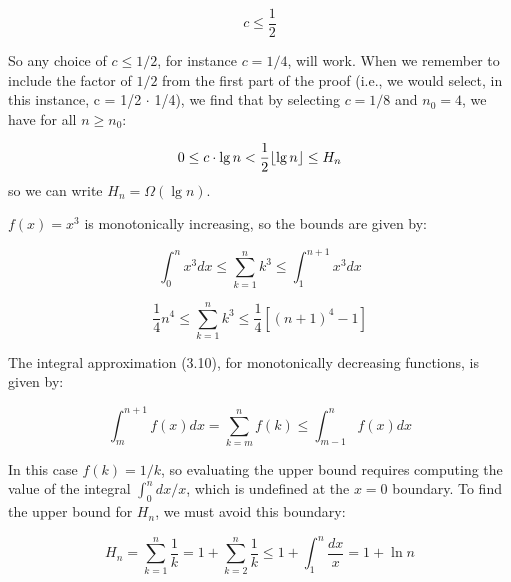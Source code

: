 \documentclass[a4paper,12pt]{article}
\DeclarePairedDelimiter\floor{\lfloor}{\rfloor}
\begin{document}
\[ c \le \frac{1}{2} \]

So any choice of $c \le 1/2$, for instance $c = 1/4$, will work. When we remember to include the factor of $1/2$ from the first part of the proof (i.e., we would select, in this instance, c = 1/2 $\cdot$ 1/4), we find that by selecting $c = 1/8$ and $n_0 = 4$, we have for all $n \ge n_0$:

\[ 0 \le c \cdot \lg n < \frac{1}{2} \floor{\lg n} \le H_n \]
 so we can write $H_n = \Omega(\lg n)$.

\vspace{5mm}

$f(x) = x^3$ is monotonically increasing, so the bounds are given by:

\[ \int_0^n x^3 dx \le \sum_{k=1}^n k^3 \le \int_1^{n+1} x^3 dx \]

\[ \frac{1}{4} n^4 \le \sum_{k=1}^n k^3  \le \frac{1}{4} \left[(n+1)^4-1 \right] \]


\vspace{5mm}

The integral approximation (3.10), for monotonically decreasing functions, is given by:

\[ \int_m^{n+1} f(x) dx = \sum_{k=m}^n f(k) \le \int_{m-1}^n f(x)dx \]

In this case $f(k) = 1/k$, so evaluating the upper bound requires computing the value of the integral $\int_0^n dx/x$, which is undefined at the $x=0$ boundary.  To find the upper bound for $H_n$, we must avoid this boundary:

\[ H_n = \sum_{k=1}^n \frac{1}{k} = 1 + \sum_{k=2}^n \frac{1}{k} \le 1 + \int_1^n \frac{dx}{x} = 1 + \ln n \] 
\end{document}

